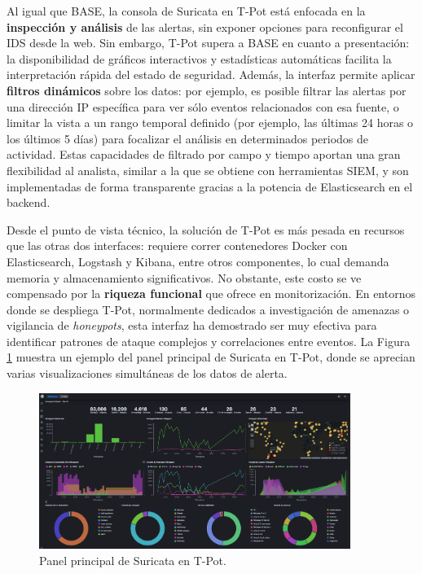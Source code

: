 \documentclass[11pt,a4paper,twoside]{report}
\begin{document}
Al igual que BASE, la consola de Suricata en T-Pot está enfocada en la \textbf{inspección y análisis} de las alertas, sin exponer opciones para reconfigurar el IDS desde la web. Sin embargo, T-Pot supera a BASE en cuanto a presentación: la disponibilidad de gráficos interactivos y estadísticas automáticas facilita la interpretación rápida del estado de seguridad. Además, la interfaz permite aplicar \textbf{filtros dinámicos} sobre los datos: por ejemplo, es posible filtrar las alertas por una dirección IP específica para ver sólo eventos relacionados con esa fuente, o limitar la vista a un rango temporal definido (por ejemplo, las últimas 24 horas o los últimos 5 días) para focalizar el análisis en determinados periodos de actividad. Estas capacidades de filtrado por campo y tiempo aportan una gran flexibilidad al analista, similar a la que se obtiene con herramientas SIEM, y son implementadas de forma transparente gracias a la potencia de Elasticsearch en el backend.\newline

Desde el punto de vista técnico, la solución de T-Pot es más pesada en recursos que las otras dos interfaces: requiere correr contenedores Docker con Elasticsearch, Logstash y Kibana, entre otros componentes, lo cual demanda memoria y almacenamiento significativos. No obstante, este costo se ve compensado por la \textbf{riqueza funcional} que ofrece en monitorización. En entornos donde se despliega T-Pot, normalmente dedicados a investigación de amenazas o vigilancia de \emph{honeypots}, esta interfaz ha demostrado ser muy efectiva para identificar patrones de ataque complejos y correlaciones entre eventos. La Figura \ref{fig:tpot-dashboard} muestra un ejemplo del panel principal de Suricata en T-Pot, donde se aprecian varias visualizaciones simultáneas de los datos de alerta.\newline

\begin{figure}[hbtp]
	\centering
	\includegraphics[width=0.9\textwidth]{documento/3.png}
	\caption{Panel principal de Suricata en T-Pot.}
	\label{fig:tpot-dashboard}
\end{figure}
\end{document}
